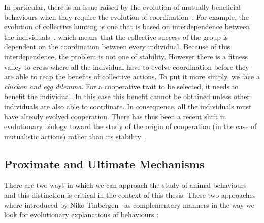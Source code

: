 
    In particular, there is an issue raised by the evolution of mutually beneficial behaviours when they require the evolution of coordination~\parencite{Alvard2001, Alvard2003, Leimar2003, Drea2009}. For example, the evolution of collective hunting is one that is based on interdependence between the individuals~\parencite{Tomasello2012}, which means that the collective success of the group is dependent on the coordination between every individual. Because of this interdependence, the problem is not one of stability. However there is a fitness valley to cross where all the individual have to evolve coordination before they are able to reap the benefits of collective actions. To put it more simply, we face a \emph{chicken and egg dilemma}. For a cooperative trait to be selected, it needs to benefit the individual. In this case this benefit cannot be obtained unless other individuals are also able to coordinate. In consequence, all the individuals must have already evolved cooperation. There has thus been a recent shift in evolutionary biology toward the study of the origin of cooperation (in the case of mutualistic actions) rather than its stability~\parencite{Forber2015}.


  \subsection{Proximate and Ultimate Mechanisms}

    There are two ways in which we can approach the study of animal behaviours and this distinction is critical in the context of this thesis. These two approaches where introduced by Niko Tinbergen~\parencite{Tinbergen1963, West2007a} as complementary manners in the way we look for evolutionary explanations of behaviours :

